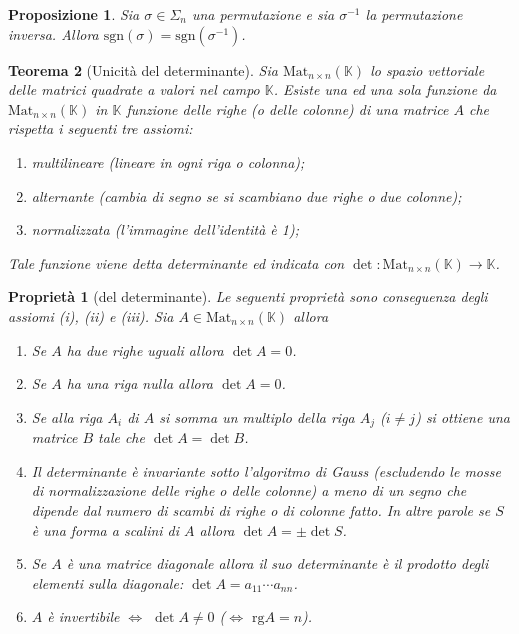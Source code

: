 \documentclass[9pt, a4paper]{article}
\newcommand{\K}{\mathbb{K}}
\newcommand{\rg}{\mathrm{rg}}
\newcommand{\sgn}{\mathrm{sgn}}
\theoremstyle{mythm}
\newtheorem{propriety}{Proprietà}[section]
\newtheorem{thm}{Teorema}[section]
\newtheorem{prop}[thm]{Proposizione}
\begin{document}
\begin{prop}
	Sia $ \sigma \in \Sigma_n $ una permutazione e sia $ \sigma^{-1} $ la permutazione inversa. Allora $ \sgn(\sigma) = \sgn(\sigma^{-1}) $. 
\end{prop}

\begin{thm}[Unicità del determinante]
	Sia $ \mathrm{Mat}_{n \times n} (\K) $  lo spazio vettoriale delle matrici quadrate  a valori nel campo $ \K $. Esiste una ed una sola funzione da $ \mathrm{Mat}_{n \times n} (\K) $ in $ \K $ funzione delle righe (o delle colonne) di una matrice $ A $ che rispetta i seguenti tre assiomi:  
	\begin{enumerate}[label = (\roman*)]
		\item \emph{multilineare} (lineare in ogni riga o colonna);
		\item \emph{alternante} (cambia di segno se si scambiano due righe o due colonne);
		\item \emph{normalizzata} (l'immagine dell'identità è 1);
	\end{enumerate}
	Tale funzione viene detta determinante ed indicata con $ \det \colon \mathrm{Mat}_{n \times n} (\K) \to \K $. 
\end{thm}

\begin{propriety}[del determinante]
	Le seguenti proprietà sono conseguenza degli assiomi (i), (ii) e (iii). Sia $ A \in \mathrm{Mat}_{n \times n} (\K) $ allora
	\begin{enumerate}[label = (\arabic*)]
		\item Se $ A $ ha due righe uguali allora $ \det{A} = 0 $.
		\item Se $ A $ ha una riga nulla allora $ \det{A} = 0 $.
		\item Se alla riga $ A_i $ di $ A $ si somma un multiplo della riga $ A_j $ ($ i \neq j $) si ottiene una matrice $ B $ tale che $ \det A = \det B $. 
		\item Il determinante è invariante sotto l'algoritmo di Gauss (escludendo le mosse di \emph{normalizzazione} delle righe o delle colonne) a meno di un segno che dipende dal numero di scambi di righe o di colonne fatto. In altre parole se $ S $ è una forma a scalini di $ A $ allora $ \det A = \pm \det S $.
		\item Se $ A $ è una matrice diagonale allora il suo determinante è il prodotto degli elementi sulla diagonale: $ \det A = a_{11} \cdots a_{nn} $. 
		\item $ A $ è invertibile $ \iff $ $ \det A \neq 0 $ ($ \iff $ $ \rg A = n $). 
	\end{enumerate}
\end{propriety}
\end{document}

